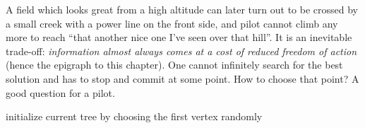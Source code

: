 A field  which looks great from a high altitude can later turn out to be crossed
by a small creek with a power line on the front side, and pilot cannot climb any
more to reach ``that another nice one I've seen over that hill''. It is an
inevitable trade-off: \textit{information almost always comes at a cost of
reduced freedom of action} (hence the epigraph to this chapter). One cannot
infinitely search for the best solution and has to stop and commit at some
point. How to choose that point? A good question for a pilot.

\begin{algorithm}[b]
\caption{Prim's Algorithm for finding Minimum Spanning Tree}\label{alg:prim_intro}
{initialize current tree by choosing the first vertex randomly\;}
\end{algorithm}

